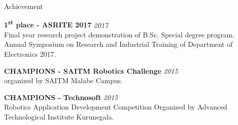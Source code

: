 \documentclass[
	11pt, %
]{./../assets/resume} %
\begin{document}









\begin{rSection}{Achievement}

	\textbf{1\textsuperscript{st} place - ASRITE 2017} \hfill \textit{2017} \\ 
	Final year research project demonstration of B.Sc. Special degree program. Annual Symposium on Research and Industrial Training of Department of Electronics 2017.

	\textbf{CHAMPIONS - SAITM Robotics Challenge} \hfill \textit{2015} \\ 
	organized by SAITM Malabe Campus.

	\textbf{CHAMPIONS - Technosoft} \hfill \textit{2015} \\ 
	Robotics Application Development Competition Organized by Advanced Technological Institute Kurunegala.

\end{rSection}

\end{document}
